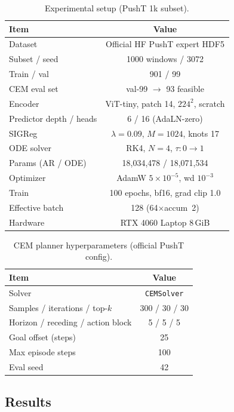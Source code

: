 \begin{table}[t]
\centering
\caption{Experimental setup (PushT 1k subset).}
\label{tab:setup}
\begin{tabular}{lc}
\toprule
Item & Value \\
\midrule
Dataset & Official HF PushT expert HDF5 \\
Subset / seed & 1000 windows / 3072 \\
Train / val & 901 / 99 \\
CEM eval set & val-99 $\to$ 93 feasible \\
Encoder & ViT-tiny, patch 14, $224^2$, scratch \\
Predictor depth / heads & 6 / 16 (AdaLN-zero) \\
SIGReg & $\lambda{=}0.09$, $M{=}1024$, knots 17 \\
ODE solver & RK4, $N{=}4$, $\tau{:}0\to1$ \\
Params (AR / ODE) & 18,034,478 / 18,071,534 \\
Optimizer & AdamW $5{\times}10^{-5}$, wd $10^{-3}$ \\
Train & 100 epochs, bf16, grad clip 1.0 \\
Effective batch & 128 (64$\times$accum~2) \\
Hardware & RTX 4060 Laptop 8\,GiB \\
\bottomrule
\end{tabular}
\end{table}

\begin{table}[t]
\centering
\caption{CEM planner hyperparameters (official PushT config).}
\label{tab:cem}
\begin{tabular}{lc}
\toprule
Item & Value \\
\midrule
Solver & \texttt{CEMSolver} \\
Samples / iterations / top-$k$ & 300 / 30 / 30 \\
Horizon / receding / action block & 5 / 5 / 5 \\
Goal offset (steps) & 25 \\
Max episode steps & 100 \\
Eval seed & 42 \\
\bottomrule
\end{tabular}
\end{table}

\subsection{Results}
\label{sec:results}

